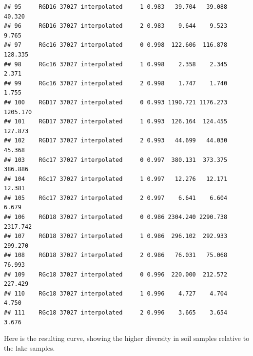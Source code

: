 \documentclass[]{article}
\newenvironment{Shaded}{\begin{snugshade}}{\end{snugshade}}
\newcommand{\CommentTok}[1]{\textcolor[rgb]{0.56,0.35,0.01}{\textit{#1}}}
\newcommand{\DataTypeTok}[1]{\textcolor[rgb]{0.13,0.29,0.53}{#1}}
\newcommand{\KeywordTok}[1]{\textcolor[rgb]{0.13,0.29,0.53}{\textbf{#1}}}
\newcommand{\NormalTok}[1]{#1}
\newcommand{\OperatorTok}[1]{\textcolor[rgb]{0.81,0.36,0.00}{\textbf{#1}}}
\newcommand{\StringTok}[1]{\textcolor[rgb]{0.31,0.60,0.02}{#1}}
\begin{document}
\begin{verbatim}
## 95     RGD16 37027 interpolated     1 0.983   39.704   39.088   40.320
## 96     RGD16 37027 interpolated     2 0.983    9.644    9.523    9.765
## 97     RGc16 37027 interpolated     0 0.998  122.606  116.878  128.335
## 98     RGc16 37027 interpolated     1 0.998    2.358    2.345    2.371
## 99     RGc16 37027 interpolated     2 0.998    1.747    1.740    1.755
## 100    RGD17 37027 interpolated     0 0.993 1190.721 1176.273 1205.170
## 101    RGD17 37027 interpolated     1 0.993  126.164  124.455  127.873
## 102    RGD17 37027 interpolated     2 0.993   44.699   44.030   45.368
## 103    RGc17 37027 interpolated     0 0.997  380.131  373.375  386.886
## 104    RGc17 37027 interpolated     1 0.997   12.276   12.171   12.381
## 105    RGc17 37027 interpolated     2 0.997    6.641    6.604    6.679
## 106    RGD18 37027 interpolated     0 0.986 2304.240 2290.738 2317.742
## 107    RGD18 37027 interpolated     1 0.986  296.102  292.933  299.270
## 108    RGD18 37027 interpolated     2 0.986   76.031   75.068   76.993
## 109    RGc18 37027 interpolated     0 0.996  220.000  212.572  227.429
## 110    RGc18 37027 interpolated     1 0.996    4.727    4.704    4.750
## 111    RGc18 37027 interpolated     2 0.996    3.665    3.654    3.676
\end{verbatim}

\begin{Shaded}
\end{Shaded}

Here is the resulting curve, showing the higher diversity in soil
samples relative to the lake samples.

\begin{Shaded}
\end{Shaded}
\end{document}
